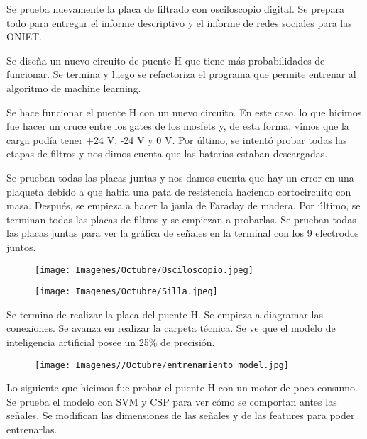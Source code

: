 \documentclass{article}
\begin{document}
Se prueba nuevamente la placa de filtrado con osciloscopio digital. Se prepara todo para entregar el informe descriptivo y el informe de redes sociales para las ONIET.



Se diseña un nuevo circuito de puente H que tiene más probabilidades de funcionar. Se termina y luego se refactoriza el programa que permite entrenar al algoritmo de machine learning.



Se hace funcionar el puente H con un nuevo circuito. En este caso, lo que hicimos fue hacer un cruce entre los gates de los mosfets y, de esta forma, vimos que la carga podía tener +24 V, -24 V y 0 V. Por último, se intentó probar todas las etapas de filtros y nos dimos cuenta que las baterías estaban descargadas.

\newpage

Se prueban todas las placas juntas y nos damos cuenta que hay un error en una plaqueta debido a que había una pata de resistencia haciendo cortocircuito con masa. Después, se empieza a hacer la jaula de Faraday de madera. Por último, se terminan todas las placas de filtros y se empiezan a probarlas. Se prueban todas las placas juntas para ver la gráfica de señales en la terminal con los 9 electrodos juntos.

\begin{figure}[H]
    \centering
    \texttt{[image: Imagenes/Octubre/Osciloscopio.jpeg]}
\end{figure}


\begin{figure}[H]
    \centering
    \texttt{[image: Imagenes/Octubre/Silla.jpeg]}
\end{figure}

Se termina de realizar la placa del puente H. Se empieza a diagramar las conexiones. Se avanza en realizar la carpeta técnica. Se ve que el modelo de inteligencia artificial posee un 25\% de precisión.

\begin{figure}[H]
    \centering
    \texttt{[image: Imagenes//Octubre/entrenamiento model.jpg]}
\end{figure}

Lo siguiente que hicimos fue probar el puente H con un motor de poco consumo. Se prueba el modelo con SVM y CSP para ver cómo se comportan antes las señales. Se modifican las dimensiones de las señales y de las features para poder entrenarlas.
\end{document}
